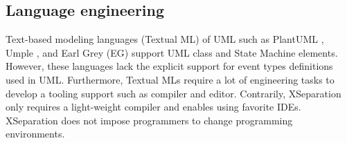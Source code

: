\subsection{Language engineering}
Text-based modeling languages (Textual ML) of UML such as PlantUML \cite{plantuml}, Umple \cite{lethbridge2010umplification}, and Earl Grey (EG) \cite{mazanec2012general} support UML class and State Machine elements.
However, these languages lack the explicit support for event types definitions used in UML.
Furthermore, 
Textual MLs require a lot of engineering tasks to develop a tooling support such as compiler and editor. 
Contrarily, XSeparation only requires a light-weight compiler and enables using favorite IDEs. %
XSeparation does not impose programmers to change programming environments.%

\begin{comment}
\begin{itemize}[\footnotesize]
	\item RAOES adapts USM features to existing programming languages while Umple or TextUML does inversely, hence RAOES profits all benefices of IDEs such as intelligent completion and easy to implement. Furthermore, RAOES allows to use all specific C++ features such as function pointers for program efficiency, which are not available in the the TMLs.
	
	\item In RAOES, the programmers write and maintain the USM-based behavior part in the same class/file containing the active class.
	
	\item RAOES support full USM features.
	
	\item RAOES automatically synchronizes the code with the system model specified by UML.
	
	\item RAOES defines the state machine topology separately from the transition table and event definition.
\end{itemize}
\end{comment}


